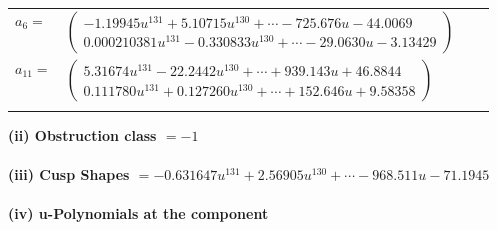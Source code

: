 \documentclass[1p]{elsarticle_modified}
\theoremstyle{definition}
\begin{document}
\begin{tabular}{m{7pt} m{180pt} m{7pt} m{180pt} }
\flushright $a_{6}=$&$\begin{pmatrix}-1.19945 u^{131}+5.10715 u^{130}+\cdots-725.676 u-44.0069\\0.000210381 u^{131}-0.330833 u^{130}+\cdots-29.0630 u-3.13429\end{pmatrix}$ \\
\flushright $a_{11}=$&$\begin{pmatrix}5.31674 u^{131}-22.2442 u^{130}+\cdots+939.143 u+46.8844\\0.111780 u^{131}+0.127260 u^{130}+\cdots+152.646 u+9.58358\end{pmatrix}$\\&\end{tabular}
\flushleft \textbf{(ii) Obstruction class $= -1$}\\~\\
\flushleft \textbf{(iii) Cusp Shapes $= -0.631647 u^{131}+2.56905 u^{130}+\cdots-968.511 u-71.1945$}\\~\\
\newpage\renewcommand{\arraystretch}{1}
\flushleft \textbf{(iv) u-Polynomials at the component}\newline \\
\end{document}

